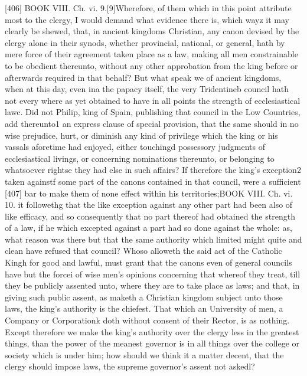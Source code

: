 [406]
BOOK VIII. Ch. vi. 9.[9]Wherefore, of them which in this point attribute most to the clergy, I would demand what evidence there is, which wayz it may clearly be shewed, that, in ancient kingdoms Christian, any canon devised by the clergy alone in their synods, whether provincial, national, or general, hath by mere force of their agreement taken place as a law, making all men constrainable to be obedient thereunto, without any other approbation from the king before or afterwards required in that behalf? But what speak we of ancient kingdoms, when at this day, even ina the papacy itself, the very Tridentineb council hath not every where as yet obtained to have in all points the strength of ecclesiastical lawc. Did not Philip, king of Spain, publishing that council in the Low Countries, add thereunto1 an express clause of special provision, that the same should in no wise prejudice, hurt, or diminish any kind of privilege which the king or his vassals aforetime had enjoyed, either touchingd possessory judgments of ecclesiastical livings, or concerning nominations thereunto, or belonging to whatsoever rightse they had else in such affairs? If therefore the king’s exception2 taken againstf some part of the canons contained in that council, were a sufficient [407] bar to make them of none effect within his territories;BOOK VIII. Ch. vi. 10. it followethg that the like exception against any other part had been also of like efficacy, and so consequently that no part thereof had obtained the strength of a law, if he which excepted against a part had so done against the whole: as, what reason was there but that the same authority which limited might quite and clean have refused that council? Whoso alloweth the said act of the Catholic Kingh for good and lawful, must grant that the canons even of general councils have but the forcei of wise men’s opinions concerning that whereof they treat, till they be publicly assented unto, where they are to take place as laws; and that, in giving such public assent, as maketh a Christian kingdom subject unto those laws, the king’s authority is the chiefest. That which an University of men, a Company or Corporationk doth without consent of their Rector, is as nothing. Except therefore we make the king’s authority over the clergy less in the greatest things, than the power of the meanest governor is in all things over the college or society which is under him; how should we think it a matter decent, that the clergy should impose laws, the supreme governor’s assent not askedl?

